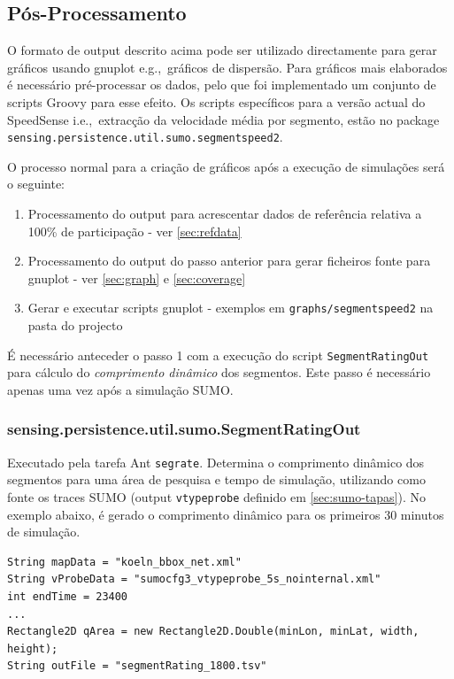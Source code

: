 \documentclass{article}
\newcommand{\ie}{i.e.,\ }
\newcommand{\eg}{e.g.,\ }
\newcommand{\tm}[1]{\texttt{#1}}
\begin{document}
\subsection{Pós-Processamento}\label{sec:posproc}
O formato de output descrito acima pode ser utilizado directamente para gerar gráficos usando gnuplot \eg gráficos de dispersão. Para gráficos mais elaborados é necessário pré-processar os dados, pelo que foi implementado um conjunto de scripts Groovy para esse efeito. Os scripts específicos para a versão actual do SpeedSense \ie extracção da velocidade média por segmento, estão no package \tm{sensing.persistence.util.sumo.segmentspeed2}. 

O processo normal para a criação de gráficos após a execução de simulações será o seguinte:

\begin{enumerate}
\item Processamento do output para acrescentar dados de referência relativa a 100\% de participação  - ver \ref{sec:refdata}
\item Processamento do output do passo anterior para gerar ficheiros fonte para gnuplot - ver \ref{sec:graph} e \ref{sec:coverage}
\item Gerar e executar scripts gnuplot - exemplos em \tm{graphs/segmentspeed2} na pasta do projecto
\end{enumerate}

É necessário anteceder o passo 1 com a execução do script \tm{SegmentRatingOut} para cálculo do \emph{comprimento dinâmico} dos segmentos. Este passo é necessário apenas uma vez após a simulação SUMO.

\subsubsection{sensing.persistence.util.sumo.SegmentRatingOut}\label{sec:segmentratingout}
Executado pela tarefa Ant \tm{segrate}. Determina o comprimento dinâmico dos segmentos para uma área de pesquisa e tempo de simulação, utilizando como fonte os traces SUMO (output \tm{vtypeprobe} definido em \ref{sec:sumo-tapas}). No exemplo abaixo, é gerado o comprimento dinâmico para os primeiros 30 minutos de simulação.

\begin{Verbatim}
String mapData = "koeln_bbox_net.xml"
String vProbeData = "sumocfg3_vtypeprobe_5s_nointernal.xml"
int endTime = 23400
...
Rectangle2D qArea = new Rectangle2D.Double(minLon, minLat, width, height);
String outFile = "segmentRating_1800.tsv"
\end{Verbatim}
\end{document}
